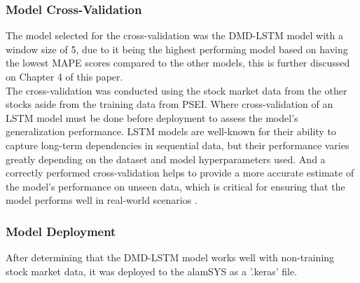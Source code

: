 \subsubsection{Model Cross-Validation}
\label{subsubsec:model_cross_validation}
The model selected for the cross-validation was the DMD-LSTM model with a window size of 5, due to it
being the highest performing model based on having the lowest MAPE scores compared to the other models,
this is further discussed on Chapter 4 of this paper.
\hfill \\

The cross-validation was conducted using the stock market data from the other stocks aside from the
training data from PSEI. Where cross-validation of an LSTM model must be done before deployment 
to assess the model's generalization performance. LSTM models are well-known for their ability 
to capture long-term dependencies in sequential data, but their performance varies greatly depending 
on the dataset and model hyperparameters used. And a correctly performed cross-validation helps to 
provide a more accurate estimate of the model's performance on unseen data, which is critical 
for ensuring that the model performs well in real-world scenarios
\cite{Mellema2020, DBLP:journals/corr/abs-1908-06272}.

\subsubsection{Model Deployment}
\label{subsubsec:model_deployment}
After determining that the DMD-LSTM model works well with non-training stock market data, 
it was deployed to the alamSYS as a '.keras' file.